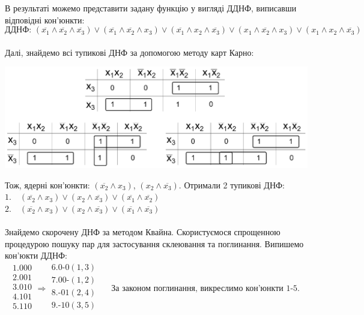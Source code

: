 \documentclass[14pt,a4paper]{scrartcl}
\theoremstyle{definition}
\theoremstyle{remark}
\theoremstyle{definition}
\theoremstyle{definition}
\begin{document}
 В результаті можемо представити задану функцію у вигляді ДДНФ, виписавши відповідні кон'юнкти:\\
 $$\textbf{ДДНФ: }  (\overline{x_1} \land \overline{x_2} \land \overline{x_3})
  \lor (\overline{x_1} \land \overline{x_2} \land x_3)
  \lor (\overline{x_1} \land x_2 \land \overline{x_3})
  \lor (x_1\land \overline{x_2} \land x_3)
  \lor (x_1 \land x_2 \land \overline{x_3})
 $$
 \pagebreak\\
 Далі, знайдемо всі тупикові ДНФ за допомогою методу карт Карно:\\
 \begin{center}
   \includegraphics{karno_5.eps}
 \end{center}
 Тож, ядерні кон'юнкти: $(\overline{x_2} \land x_3)$, $(x_2 \land \overline{x_3})$.
Отримали 2 тупикові ДНФ:\\
$1.\quad (\overline{x_2} \land x_3)\lor (x_2 \land \overline{x_3}) \lor (\overline{x_1} \land \overline{x_2})$\\
$2.\quad (\overline{x_2} \land x_3)\lor (x_2 \land \overline{x_3}) \lor (\overline{x_1} \land \overline{x_3})$\\
 \\
 Знайдемо скорочену ДНФ за методом Квайна. Скористуємося спрощенною процедурою пошуку пар для застосування склеювання та поглинання. Випишемо кон'юкти ДДНФ:\\
 $$
 \begin{gathered}
1.  000\\
2.  001\\
3.  010\\
4.  101\\
5.  110\\
 \end{gathered}
\Longrightarrow
\begin{gathered}
 6. 0\text{-}0 (1,3)\\
 7. 00\text{-} (1,2)\\
 8. \text{-}01 (2,4)\\
 9. \text{-}10 (3,5)\\
\end{gathered}
\quad
\begin{gathered}
\text{За законом поглинання, викреслимо кон'юнкти 1-5.}
\end{gathered}
 $$
\end{document}
